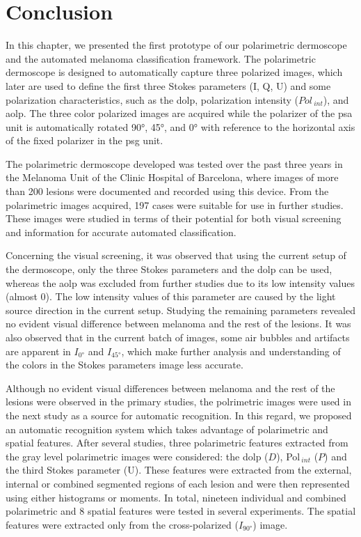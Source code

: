 \section{Conclusion}
\label{sec:chp5-sec7}

In this chapter, we presented the first prototype of our polarimetric dermoscope and the automated melanoma classification framework.
The polarimetric dermoscope is designed to automatically capture three polarized images, which later are used to define the first three Stokes parameters (I, Q, U) and some polarization characteristics, such as the \acf{dolp}, polarization intensity ($Pol_{~int}$), and \acf{aolp}.
The three color polarized images are acquired while the polarizer of the \ac{psa} unit is automatically rotated \ang{90}, \ang{45}, and \ang{0} with reference to the horizontal axis of the fixed polarizer in the \ac{psg} unit.

The polarimetric dermoscope developed was tested over the past three years in the Melanoma Unit of the Clinic Hospital of Barcelona, where images of more than 200 lesions were documented and recorded using this device. 
From the polarimetric images acquired, 197 cases were suitable for use in further studies.
These images were studied in terms of their potential for both visual screening and information for accurate automated classification.

Concerning the visual screening, it was observed that using the current setup of the dermoscope, only the three Stokes parameters and the \ac{dolp} can be used, whereas the \ac{aolp} was excluded from further studies due to its low intensity values (almost 0).
The low intensity values of this parameter are caused by the light source direction in the current setup. 
Studying the remaining parameters revealed no evident visual difference between melanoma and the rest of the lesions.
It was also observed that in the current batch of images, some air bubbles and artifacts are apparent in $I_{\ang{0}}$ and $I_{\ang{45}}$, which make further analysis and understanding of the colors in the Stokes parameters image less accurate. 

Although no evident visual differences between melanoma and the rest of the lesions were observed in the primary studies, the polrimetric images were used in the next study as a source for automatic recognition.
In this regard, we proposed an automatic recognition system which takes advantage of polarimetric and spatial features.
After several studies, three polarimetric features extracted from the gray level polarimetric images were considered: the \ac{dolp} ($D$), Pol$_{~int}$ ($P$) and the third Stokes parameter (U).
These features were extracted from the external, internal or combined segmented regions of each lesion and were then represented using either histograms or moments.
In total, nineteen individual and combined polarimetric and 8 spatial features were tested in several experiments.
The spatial features were extracted only from the cross-polarized ($I_{\ang{90}}$) image. 

